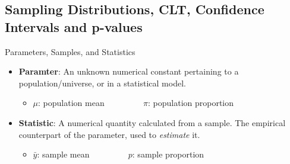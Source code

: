 \documentclass[10pt]{beamer}\usepackage[]{graphicx}\usepackage[]{color}
\begin{document}
\subsection{Sampling Distributions, CLT, Confidence Intervals and p-values}


\begin{frame}{Parameters,  Samples,  and  Statistics}
	\begin{itemize}
		\item \textbf{Paramter}: An  unknown  numerical  constant  pertaining  to  a  population/universe,  or  in  a  statistical  model. 
		\begin{itemize}
			\item $\mu$: population mean $\qquad\qquad$ $\pi$: population proportion
		\end{itemize}

		\item \textbf{Statistic}: A  numerical  quantity  calculated  from  a  sample. The  empirical counterpart of the parameter,  used  to  \textit{estimate}  it.

		\begin{itemize}
			\item $\bar{y}$: sample mean $\qquad\qquad$ $p$: sample proportion
		\end{itemize}
	\end{itemize}
	
	\pause
	
	
\end{frame}
\end{document}
